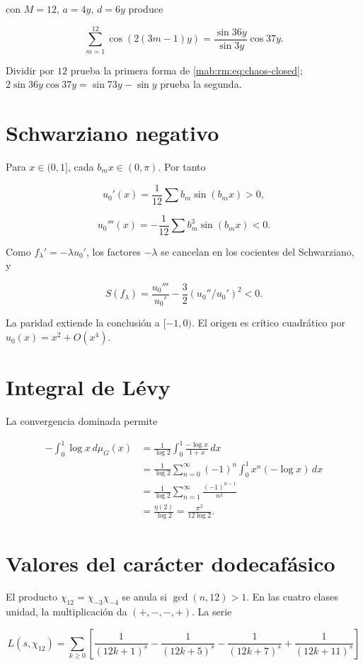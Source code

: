con \(M=12\), \(a=4y\), \(d=6y\) produce

\[
\sum_{m=1}^{12}\cos(2(3m-1)y)
=\frac{\sin36y}{\sin3y}\cos37y.
\]

Dividir por \(12\) prueba la primera forma de \cref{mab:rm:eq:chaos-closed}; \(2\sin36y\cos37y=\sin73y-\sin y\) prueba la segunda.

\section{Schwarziano negativo}

Para \(x\in(0,1]\), cada \(b_mx\in(0,\pi)\). Por tanto

\[
u_0'(x)=\frac1{12}\sum b_m\sin(b_mx)>0,
\]

\[
u_0'''(x)=-\frac1{12}\sum b_m^3\sin(b_mx)<0.
\]

Como \(f_\lambda'=-\lambda u_0'\), los factores \(-\lambda\) se cancelan en los cocientes del Schwarziano, y

\[
S(f_\lambda)=\frac{u_0'''}{u_0'}
-\frac32(u_0''/u_0')^2<0.
\]

La paridad extiende la conclusi\'on a \([-1,0)\). El origen es cr\'itico cuadr\'atico por \(u_0(x)=x^2+O(x^4)\).

\section{Integral de L\'evy}

La convergencia dominada permite

\begin{align*}
-\int_0^1\log x\,d\mu_G(x)
&=\frac1{\log2}\int_0^1\frac{-\log x}{1+x}\,dx\\
&=\frac1{\log2}\sum_{n=0}^\infty(-1)^n
\int_0^1x^n(-\log x)\,dx\\
&=\frac1{\log2}\sum_{n=1}^\infty\frac{(-1)^{n-1}}{n^2}\\
&=\frac{\eta(2)}{\log2}
=\frac{\pi^2}{12\log2}.
\end{align*}

\section{Valores del car\'acter dodecaf\'asico}

El producto \(\chi_{12}=\chi_{-3}\chi_{-4}\) se anula si \(\gcd(n,12)>1\). En las cuatro clases unidad, la multiplicaci\'on da \((+,-,-,+)\). La serie

\[
L(s,\chi_{12})=
\sum_{k\ge0}\left[
\frac1{(12k+1)^s}-\frac1{(12k+5)^s}
-\frac1{(12k+7)^s}+\frac1{(12k+11)^s}
\right]
\]

